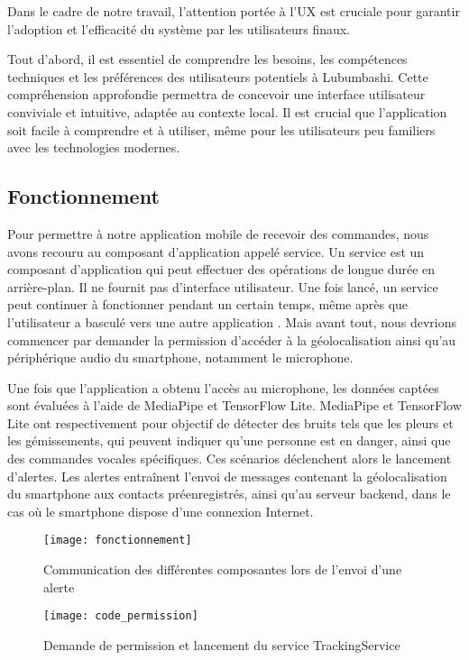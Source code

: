 Dans le cadre de notre travail, l'attention portée à l'UX est cruciale pour garantir l'adoption et l'efficacité du système par les utilisateurs finaux.

Tout d'abord, il est essentiel de comprendre les besoins, les compétences techniques et les préférences des utilisateurs potentiels à Lubumbashi. Cette compréhension approfondie permettra de concevoir une interface utilisateur conviviale et intuitive, adaptée au contexte local. Il est crucial que l'application soit facile à comprendre et à utiliser, même pour les utilisateurs peu familiers avec les technologies modernes.

\subsection{Fonctionnement}

Pour permettre à notre application mobile de recevoir des commandes, nous avons recouru au composant d’application appelé service. Un service est un composant d'application qui peut effectuer des opérations de longue durée en arrière-plan. Il ne fournit pas d'interface utilisateur. Une fois lancé, un service peut continuer à fonctionner pendant un certain temps, même après que l'utilisateur a basculé vers une autre application \cite{services}. Mais avant tout, nous devrions commencer par demander la permission d'accéder à la géolocalisation ainsi qu'au périphérique audio du smartphone, notamment le microphone.

Une fois que l'application a obtenu l'accès au microphone, les données captées sont évaluées à l'aide de MediaPipe et TensorFlow Lite. MediaPipe et TensorFlow Lite ont respectivement pour objectif de détecter des bruits tels que les pleurs et les gémissements, qui peuvent indiquer qu'une personne est en danger, ainsi que des commandes vocales spécifiques. Ces scénarios déclenchent alors le lancement d'alertes. Les alertes entraînent l'envoi de messages contenant la géolocalisation du smartphone aux contacts préenregistrés, ainsi qu'au serveur backend, dans le cas où le smartphone dispose d'une connexion Internet.

\begin{figure}[H]
	\centering
	\texttt{[image: fonctionnement]}
	\caption{Communication des différentes composantes lors de l’envoi d’une alerte}
\end{figure}

\begin{figure}[H]
	\centering
	\texttt{[image: code\_permission]}
	\caption{Demande de permission et lancement du service TrackingService}
\end{figure}

